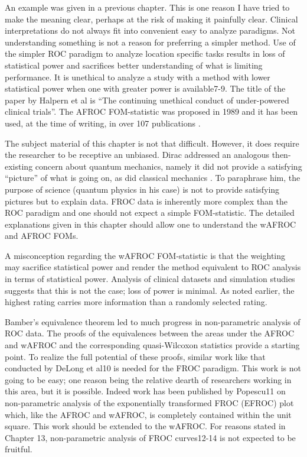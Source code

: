 \documentclass[
]{book}
\begin{document}
An example was given in a previous chapter. This is one reason I have tried to make the meaning clear, perhaps at the risk of making it painfully clear. Clinical interpretations do not always fit into convenient easy to analyze paradigms. Not understanding something is not a reason for preferring a simpler method. Use of the simpler ROC paradigm to analyze location specific tasks results in loss of statistical power and sacrifices better understanding of what is limiting performance. It is unethical to analyze a study with a method with lower statistical power when one with greater power is available7-9. The title of the paper by Halpern et al is ``The continuing unethical conduct of under-powered clinical trials''. The AFROC FOM-statistic was proposed in 1989 and it has been used, at the time of writing, in over 107 publications .

The subject material of this chapter is not that difficult. However, it does require the researcher to be receptive an unbiased. Dirac addressed an analogous then-existing concern about quantum mechanics, namely it did not provide a satisfying ``picture'' of what is going on, as did classical mechanics . To paraphrase him, the purpose of science (quantum physics in his case) is not to provide satisfying pictures but to explain data. FROC data is inherently more complex than the ROC paradigm and one should not expect a simple FOM-statistic. The detailed explanations given in this chapter should allow one to understand the wAFROC and AFROC FOMs.

A misconception regarding the wAFROC FOM-statistic is that the weighting may sacrifice statistical power and render the method equivalent to ROC analysis in terms of statistical power. Analysis of clinical datasets and simulation studies suggests that this is not the case; loss of power is minimal. As noted earlier, the highest rating carries more information than a randomly selected rating.

Bamber's equivalence theorem led to much progress in non-parametric analysis of ROC data. The proofs of the equivalences between the areas under the AFROC and wAFROC and the corresponding quasi-Wilcoxon statistics provide a starting point. To realize the full potential of these proofs, similar work like that conducted by DeLong et al10 is needed for the FROC paradigm. This work is not going to be easy; one reason being the relative dearth of researchers working in this area, but it is possible. Indeed work has been published by Popescu11 on non-parametric analysis of the exponentially transformed FROC (EFROC) plot which, like the AFROC and wAFROC, is completely contained within the unit square. This work should be extended to the wAFROC. For reasons stated in Chapter 13, non-parametric analysis of FROC curves12-14 is not expected to be fruitful.
\end{document}
